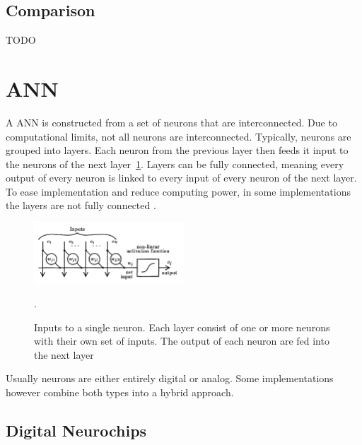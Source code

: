\documentclass[conference]{IEEEtran}
\begin{document}

    \subsection{Comparison}

    TODO

    \section{ANN}


    A ANN is constructed from a set of neurons that are interconnected.
    Due to computational limits, not all neurons are interconnected.
    Typically, neurons are grouped into layers.
    Each neuron from the previous layer then feeds it input to the neurons of the next layer~\ref{fig:layer}.
    Layers can be fully connected, meaning every output of every neuron is linked to every input of every neuron of the next layer.
    To ease implementation and reduce computing power, in some implementations the layers are not fully connected \cite{boser1991analog}.

    \begin{figure}[h]
        \centering
        \includegraphics[width=0.5\textwidth]{resources/network-layer.png}
        \caption{Inputs to a single neuron.
        Each layer consist of one or more neurons with their own set of inputs.
        The output of each neuron are fed into the next layer~\cite[Fig.~1]{ms1990digital}}.
        \label{fig:layer}
    \end{figure}

    Usually neurons are either entirely digital or analog.
    Some implementations however combine both types into a hybrid approach.

    \subsection{Digital Neurochips}

\end{document}
